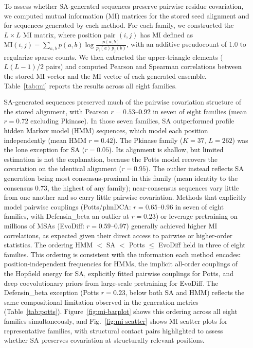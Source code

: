 \documentclass[10pt]{article}
\begin{document}
To assess whether SA-generated sequences preserve pairwise residue covariation, we computed mutual information (MI) matrices for the stored seed alignment and for sequences generated by each method. For each family, we constructed the $L \times L$ MI matrix, where position pair $(i, j)$ has MI defined as $\mathrm{MI}(i,j) = \sum_{a,b} p(a,b) \log\frac{p(a,b)}{p_i(a)\, p_j(b)}$, with an additive pseudocount of 1.0 to regularize sparse counts. We then extracted the upper-triangle elements ($L(L{-}1)/2$ pairs) and computed Pearson and Spearman correlations between the stored MI vector and the MI vector of each generated ensemble. Table~\ref{tab:mi} reports the results across all eight families.

SA-generated sequences preserved much of the pairwise covariation structure of the stored alignment, with Pearson $r{=}0.53$--$0.92$ in seven of eight families (mean $r{=}0.72$ excluding Pkinase). In those seven families, SA outperformed profile hidden Markov model (HMM) sequences, which model each position independently (mean HMM $r{=}0.42$). The Pkinase family ($K{=}37$, $L{=}262$) was the lone exception for SA ($r{=}0.05$). Its alignment is shallow, but limited estimation is not the explanation, because the Potts model recovers the covariation on the identical alignment ($r{=}0.95$). The outlier instead reflects SA generation being most consensus-proximal in this family (mean identity to the consensus $0.73$, the highest of any family); near-consensus sequences vary little from one another and so carry little pairwise covariation. Methods that explicitly model pairwise couplings (Potts/plmDCA: $r{=}0.65$--$0.96$ in seven of eight families, with Defensin\_beta an outlier at $r{=}0.23$) or leverage pretraining on millions of MSAs (EvoDiff: $r{=}0.59$--$0.97$) generally achieved higher MI correlations, as expected given their direct access to pairwise or higher-order statistics. The ordering HMM $<$ SA $<$ Potts $\leq$ EvoDiff held in three of eight families. This ordering is consistent with the information each method encodes: position-independent frequencies for HMMs, the implicit all-order couplings of the Hopfield energy for SA, explicitly fitted pairwise couplings for Potts, and deep coevolutionary priors from large-scale pretraining for EvoDiff. The Defensin\_beta exception (Potts $r{=}0.23$, below both SA and HMM) reflects the same compositional limitation observed in the generation metrics (Table~\ref{tab:potts}). Figure~\ref{fig:mi-barplot} shows this ordering across all eight families simultaneously, and Fig.~\ref{fig:mi-scatter} shows MI scatter plots for representative families, with structural contact pairs highlighted to assess whether SA preserves covariation at structurally relevant positions.
\end{document}
